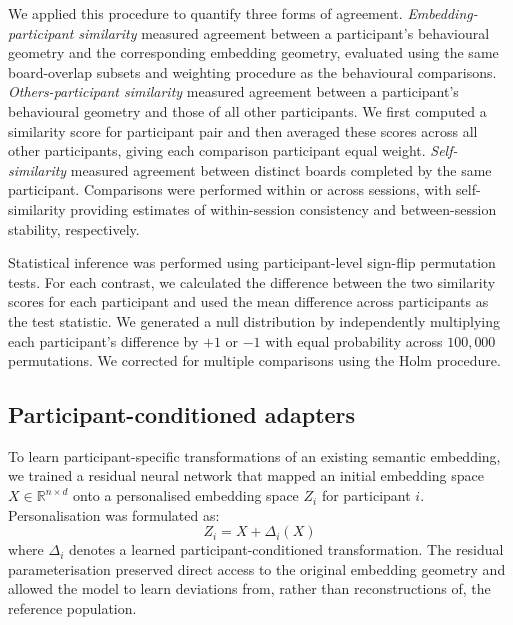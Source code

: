 \documentclass[pdflatex,sn-mathphys]{sn-jnl}
\begin{document}
We applied this procedure to quantify three forms of agreement. \textit{Embedding-participant similarity} measured agreement between a participant's behavioural geometry and the corresponding embedding geometry, evaluated using the same board-overlap subsets and weighting procedure as the behavioural comparisons. \textit{Others-participant similarity} measured agreement between a participant's behavioural geometry and those of all other participants. We first computed a similarity score for participant pair and then averaged these scores across all other participants, giving each comparison participant equal weight. \textit{Self-similarity} measured agreement between distinct boards completed by the same participant. Comparisons were performed within or across sessions, with self-similarity providing estimates of within-session consistency and between-session stability, respectively.

Statistical inference was performed using participant-level sign-flip permutation tests. For each contrast, we calculated the difference between the two similarity scores for each participant and used the mean difference across participants as the test statistic. We generated a null distribution by independently multiplying each participant's difference by $+1$ or $-1$ with equal probability across $100,000$ permutations. We corrected for multiple comparisons using the Holm procedure.

\subsection{Participant-conditioned adapters}\label{implementation}
To learn participant-specific transformations of an existing semantic embedding, we trained a residual neural network\cite{delta} that mapped an initial embedding space $X\in\mathbb{R}^{n\times d}$ onto a personalised embedding space $Z_i$ for participant $i$. Personalisation was formulated as:
\begin{equation*}
    Z_i = X + \Delta_i(X)
\end{equation*}
where $\Delta_i$ denotes a learned participant-conditioned transformation. The residual parameterisation preserved direct access to the original embedding geometry and allowed the model to learn deviations from, rather than reconstructions of, the reference population.
\end{document}
